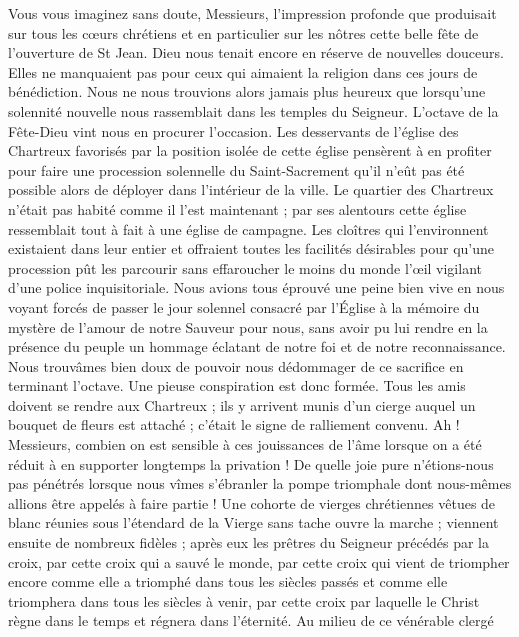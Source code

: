Vous vous imaginez sans doute, Messieurs, l'impression profonde que produisait sur tous les cœurs chrétiens et en particulier sur les nôtres cette belle fête de l'ouverture de St Jean. Dieu nous tenait encore en réserve de nouvelles douceurs. Elles ne manquaient pas pour ceux qui aimaient la religion dans ces jours de bénédiction. Nous ne nous trouvions alors jamais plus heureux que lorsqu'une solennité nouvelle nous rassemblait dans les temples du Seigneur. L'octave de la Fête-Dieu vint nous en procurer l'occasion. Les desservants de l'église des Chartreux favorisés par la position isolée de cette église pensèrent à en profiter pour faire une procession solennelle du Saint-Sacrement qu’il n’eût pas été possible alors de déployer dans l'intérieur de la ville. Le quartier des Chartreux n'était pas habité comme il l'est maintenant ; par ses alentours cette église ressemblait tout à fait à une église de campagne. Les cloîtres qui l'environnent existaient dans leur entier et offraient toutes les facilités désirables pour qu'une
procession pût les parcourir sans effaroucher le moins du monde l’œil vigilant d’une police inquisitoriale. Nous avions tous éprouvé une peine bien vive en nous voyant forcés de passer le jour solennel consacré par l'Église à la mémoire du mystère de l'amour de notre Sauveur pour nous, sans avoir pu lui rendre en la présence du peuple un hommage éclatant de notre foi et de notre reconnaissance. Nous trouvâmes bien doux de pouvoir nous dédommager de ce sacrifice en terminant l'octave. Une pieuse conspiration est donc formée. Tous les amis doivent se rendre aux Chartreux ; ils y arrivent munis d'un cierge auquel un bouquet de fleurs est attaché ; c'était le signe de ralliement convenu. Ah ! Messieurs, combien on est sensible à ces jouissances de l'âme lorsque on a été réduit à en supporter longtemps la privation ! De quelle joie pure n'étions-nous pas pénétrés lorsque nous vîmes s'ébranler la pompe triomphale dont nous-mêmes allions être appelés à faire partie ! Une cohorte de vierges chrétiennes vêtues de blanc réunies sous l'étendard de la Vierge sans tache ouvre la marche ; viennent ensuite de nombreux fidèles ; après eux les prêtres du Seigneur précédés par la croix, par cette croix qui a sauvé le monde, par cette croix qui vient de triompher encore comme elle a triomphé dans tous les siècles passés et comme elle triomphera dans tous les siècles à venir, par cette croix par laquelle le Christ règne dans le temps et régnera dans l'éternité. Au milieu de ce vénérable clergé
